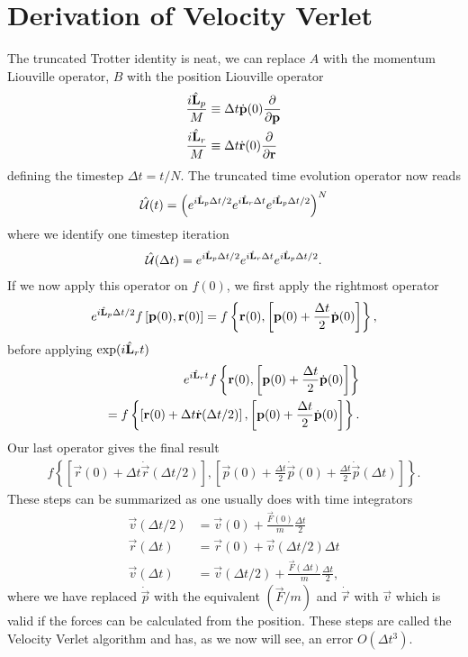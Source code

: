 \section{Derivation of Velocity Verlet}
The truncated Trotter identity is neat, we can replace $A$ with the momentum Liouville operator, $B$ with the position Liouville operator
\begin{align}
	\frac{i\hat{\mathbf L}_p}{M} &\equiv \Delta t\dot{\mathbf p}(0)\frac{\partial}{\partial \mathbf p}\\
	\frac{i\hat{\mathbf L}_r}{M} &\equiv \Delta t\dot{\mathbf r}(0)\frac{\partial}{\partial \mathbf r}
\end{align}
defining the timestep $\Delta t = t/N$. The truncated time evolution operator now reads
\begin{align}
	\hat {\mathcal U} (t) = \left(e^{i\hat{\mathbf L}_p \Delta t/2}e^{i\hat{\mathbf L}_r \Delta t}e^{i\hat{\mathbf L}_p \Delta t/2}\right)^N
\end{align}
where we identify one timestep iteration
\begin{align}
	\hat {\mathcal U} (\Delta t) = e^{i\hat{\mathbf L}_p \Delta t/2}e^{i\hat{\mathbf L}_r \Delta t}e^{i\hat{\mathbf L}_p \Delta t/2}.
\end{align}
If we now apply this operator on $f(0)$, we first apply the rightmost operator
\begin{align}
	e^{i\hat{\mathbf L}_p \Delta t/2}f\left[\mathbf p(0), \mathbf r(0)\right] = f\left\{\mathbf r(0), \left[\mathbf p(0) + \frac{\Delta t}{2}\dot{\mathbf p}(0)\right] \right\},
\end{align}
before applying $\exp(i\hat{\mathbf L}_r t)$
\begin{align}
	e^{i\hat{\mathbf L}_r t}f\left\{\mathbf r(0), \left[\mathbf p(0) + \frac{\Delta t}{2}\dot{\mathbf p}(0)\right] \right\}\\
	= f\left\{\left[\mathbf r(0) + \Delta t \dot{\mathbf r}(\Delta t/2)\right], \left[\mathbf p(0) + \frac{\Delta t}{2}\dot{\mathbf p}(0)\right] \right\}.
\end{align}
Our last operator gives the final result
\begin{align}
	f\left\{\left[\vec r(0) + \Delta t \dot{\vec r}(\Delta t/2)\right], \left[\vec p(0) + \frac{\Delta t}{2}\dot{\vec p}(0) + \frac{\Delta t}{2}\dot{\vec p}(\Delta t)\right] \right\}.
\end{align}
These steps can be summarized as one usually does with time integrators
\begin{align}
	\vec v(\Delta t/2) &= \vec v(0) + \frac{\vec F(0)}{m}\frac{\Delta t}{2}\\
	\vec r(\Delta t) &= \vec r(0) + \vec v(\Delta t/2)\Delta t\\
	\vec v(\Delta t) &= \vec v(\Delta t/2) + \frac{\vec F(\Delta t)}{m}\frac{\Delta t}{2},
\end{align}
where we have replaced $\dot{\vec p}$ with the equivalent $(\vec F/m)$ and $\dot{\vec r}$ with $\vec v$ which is valid if the forces can be calculated from the position. These steps are called the Velocity Verlet algorithm and has, as we now will see, an error $O(\Delta t^3)$.

